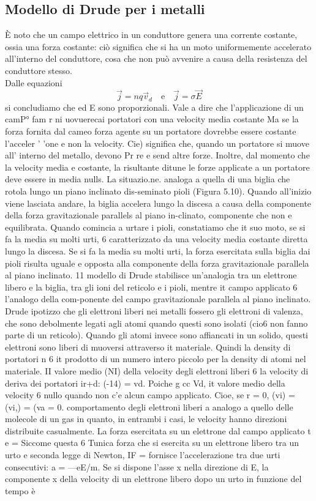 \documentclass[a4paper]{extarticle}
\begin{document}
\subsection{Modello di Drude per i metalli}
È noto che un campo elettrico in un conduttore genera una corrente costante, ossia una forza costante: ciò significa che si ha un moto uniformemente accelerato all'interno del conduttore, cosa che non può avvenire a causa della resistenza del conduttore stesso.\\
Dalle equazioni
\[\vec j = n q \vec{v}_d \hspace{1em} \text{e} \hspace{1em} \vec j = \sigma \vec E\]
si concludiamo che ed E sono proporzionali. Vale a dire che l'applicazione di un camP° fam r ni uovuerecai portatori con una velocity media costante Ma se la forza fornita dal cameo   forza agente su un portatore dovrebbe essere costante l'acceler ' 'one e non la velocity. Cie) significa che, quando un portatore si muove all' interno del metallo, devono Pr re e send altre forze. Inoltre, dal momento che la velocity media e costante, la risultante ditune le forze applicate a un portatore deve essere in media nulls. La situazio.ne. analoga a quella di una biglia che rotola lungo un piano inclinato dis-seminato pioli (Figura 5.10). Quando all'inizio viene lasciata andare, la biglia accelera lungo la discesa a causa della componente della forza gravitazionale parallels al piano in-clinato, componente che non e equilibrata. Quando comincia a urtare i pioli, constatiamo che it suo moto, se si fa la media su molti urti, 6 caratterizzato da una velocity media costante diretta lungo la discesa. Se si fa la media su molti urti, la forza esercitata sulla biglia dai pioli risulta uguale e opposta alla componente della forza gravitazionale parallela al piano inclinato. 11 modello di Drude stabilisce un'analogia tra un elettrone libero e la biglia, tra gli ioni del reticolo e i pioli, mentre it campo applicato 6 l'analogo della com-ponente del campo gravitazionale parallela al piano inclinato. Drude ipotizzo che gli elettroni liberi nei metalli fossero gli elettroni di valenza, che sono debolmente legati agli atomi quando questi sono isolati (cio6 non fanno parte di un reticolo). Quando gli atomi invece sono affiancati in un solido, questi elettroni sono liberi di muoversi attraverso it materiale. Quindi la density di portatori n 6 it prodotto di un numero intero piccolo per la density di atomi nel materiale. II valore medio (NI) della velocity degli elettroni liberi 6 la velocity di deriva dei portatori ir+d: (-14) = vd. Poiche g cc Vd, it valore medio della velocity 6 nullo quando non c'e alcun campo applicato. Cioe, se r = 0, (vi) = (vi,) = (va = 0. comportamento degli elettroni liberi a analogo a quello delle molecole di un gas in quanto, in entrambi i casi, le velocity hanno direzioni distribuite casualmente. La forza esercitata su un elettrone dal campo applicato t e = Siccome questa 6 Tunica forza che si esercita su un elettrone libero tra un urto e seconda legge di Newton, IF = fornisce l'accelerazione tra due urti consecutivi: a = —eE/m. Se si dispone l'asse x nella direzione di E, la componente x della velocity di un elettrone libero dopo un urto in funzione del tempo è
\end{document}
